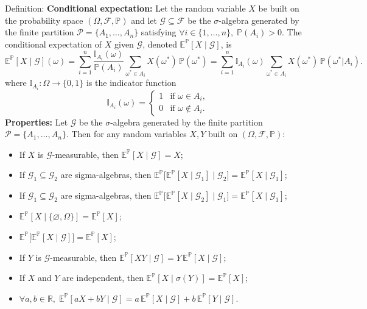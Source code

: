 \documentclass[12pt,a4paper]{article}
\begin{document}
Definition: \textbf{Conditional expectation:}
\vspace{0.5em}
Let the random variable $X$ be built on the probability space $(\Omega, \mathcal{F}, \mathbb{P})$ and let $\mathcal{G} \subseteq \mathcal{F}$ be the $\sigma$-algebra generated by the finite partition $\mathcal{P} = \{A_1,\ldots,A_n\}$ satisfying $\forall i \in \{1,\ldots,n\},\; \mathbb{P}(A_i) > 0$. The conditional expectation of $X$ given $\mathcal{G}$, denoted $\mathbb{E}^{\mathbb{P}}[X\mid\mathcal{G}]$, is
\[
\mathbb{E}^{\mathbb{P}}[X\mid\mathcal{G}](\omega) = \sum_{i=1}^{n} \frac{\mathbb{I}_{A_i}(\omega)}{\mathbb{P}(A_i)} \sum_{\omega^* \in A_i} X(\omega^*)\,\mathbb{P}(\omega^*) = \sum_{i=1}^{n} \mathbb{I}_{A_i}(\omega) \sum_{\omega^* \in A_i} X(\omega^*)\,\mathbb{P}(\omega^*|A_i).
\]
where $\mathbb{I}_{A_i}:\Omega \to \{0,1\}$ is the indicator function
\[
\mathbb{I}_{A_i}(\omega) = \begin{cases} 1 & \text{if } \omega \in A_i,\\ 0 & \text{if } \omega \notin A_i. \end{cases}
\]
\textbf{Properties:}
\vspace{0.5em}
Let $\mathcal{G}$ be the $\sigma$-algebra generated by the finite partition $\mathcal{P}=\{A_1,\ldots,A_n\}$. Then for any random variables $X,Y$ built on $(\Omega,\mathcal{F},\mathbb{P})$:
\begin{itemize}
	\item[EC1] If $X$ is $\mathcal{G}$-measurable, then $\mathbb{E}^{\mathbb{P}}[X\mid\mathcal{G}] = X$;
	\item[EC2] If $\mathcal{G}_1 \subseteq \mathcal{G}_2$ are sigma-algebras, then $\mathbb{E}^{\mathbb{P}}\bigl[\mathbb{E}^{\mathbb{P}}[X\mid\mathcal{G}_1]\mid\mathcal{G}_2\bigr] = \mathbb{E}^{\mathbb{P}}[X\mid\mathcal{G}_1]$;
	\item[EC3] If $\mathcal{G}_1 \subseteq \mathcal{G}_2$ are sigma-algebras, then $\mathbb{E}^{\mathbb{P}}\bigl[\mathbb{E}^{\mathbb{P}}[X\mid\mathcal{G}_2]\mid\mathcal{G}_1\bigr] = \mathbb{E}^{\mathbb{P}}[X\mid\mathcal{G}_1]$;
	\item[EC4] $\mathbb{E}^{\mathbb{P}}[X\mid\{\varnothing,\Omega\}] = \mathbb{E}^{\mathbb{P}}[X]$;
	\item[EC5] $\mathbb{E}^{\mathbb{P}}\bigl[\mathbb{E}^{\mathbb{P}}[X\mid\mathcal{G}]\bigr] = \mathbb{E}^{\mathbb{P}}[X]$;
	\item[EC6] If $Y$ is $\mathcal{G}$-measurable, then $\mathbb{E}^{\mathbb{P}}[XY\mid\mathcal{G}] = Y\,\mathbb{E}^{\mathbb{P}}[X\mid\mathcal{G}]$;
	\item[EC7] If $X$ and $Y$ are independent, then $\mathbb{E}^{\mathbb{P}}[X\mid\sigma(Y)] = \mathbb{E}^{\mathbb{P}}[X]$;
	\item[EC8] $\forall a,b \in \mathbb{R},\; \mathbb{E}^{\mathbb{P}}[aX + bY\mid\mathcal{G}] = a\,\mathbb{E}^{\mathbb{P}}[X\mid\mathcal{G}] + b\,\mathbb{E}^{\mathbb{P}}[Y\mid\mathcal{G}]$.
\end{itemize}
\vspace{1em}
\end{document}
